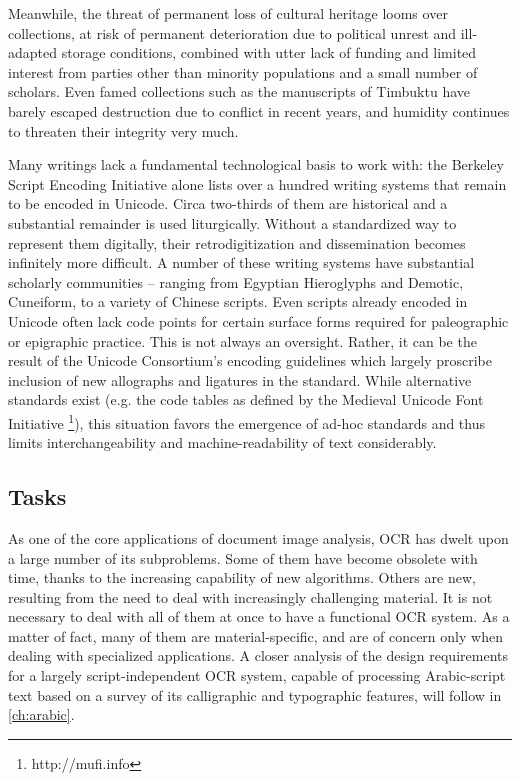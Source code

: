 Meanwhile, the threat of permanent loss of cultural heritage looms over
collections, at risk of permanent deterioration due to political unrest and
ill-adapted storage conditions, combined with utter lack of funding and limited
interest from parties other than minority populations and a small number of
scholars. Even famed collections such as the manuscripts of Timbuktu have
barely escaped destruction due to conflict in recent years, and humidity
continues to threaten their integrity very much.

Many writings lack a fundamental technological basis to work with: the Berkeley
Script Encoding Initiative alone lists over a hundred writing systems that
remain to be encoded in Unicode. Circa two-thirds of them are historical and a
substantial remainder is used liturgically. Without a standardized way to
represent them digitally, their retrodigitization and dissemination becomes
infinitely more difficult. A number of these writing systems have substantial
scholarly communities – ranging from Egyptian Hieroglyphs and Demotic,
Cuneiform, to a variety of Chinese scripts. Even scripts already encoded in
Unicode often lack code points for certain surface forms required for
paleographic or epigraphic practice. This is not always an oversight. Rather,
it can be the result of the Unicode Consortium’s encoding guidelines which
largely proscribe inclusion of new allographs and ligatures in the standard.
While alternative standards exist (e.g. the code tables as defined by the
Medieval Unicode Font Initiative \footnote{http://mufi.info}), this situation
favors the emergence of ad-hoc standards and thus limits interchangeability and
machine-readability of text considerably.

\subsection{Tasks}

As one of the core applications of document image analysis, OCR has dwelt upon
a large number of its subproblems. Some of them have become obsolete with time,
thanks to the increasing capability of new algorithms. Others are new,
resulting from the need to deal with increasingly challenging material. It is
not necessary to deal with all of them at once to have a functional OCR system.
As a matter of fact, many of them are material-specific, and are of concern
only when dealing with specialized applications. A closer analysis of the
design requirements for a largely script-independent OCR system, capable of
processing Arabic-script text based on a survey of its calligraphic and
typographic features, will follow in \ref{ch:arabic}.

